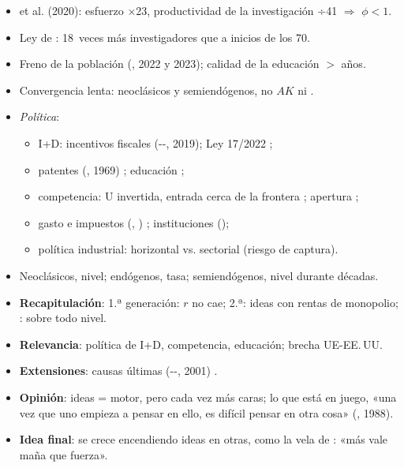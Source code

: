 \documentclass{article}
\begin{document}
\begin{columnas}
\begin{itemize}
\item {} et al. (2020): esfuerzo ×23, productividad de la investigación ÷41 $\Rightarrow$ $\phi<1$.
\item Ley de : 18~veces más investigadores que a inicios de los 70.
\item Freno de la población (, 2022 y 2023); calidad de la educación $>$ años.
\item Convergencia lenta: neoclásicos y semiendógenos, no $AK$ ni  .
\end{itemize}
\begin{itemize}
\item \emph{Política}:
  \begin{itemize}
  \item I+D: incentivos fiscales (--, 2019); Ley 17/2022 ;
  \item patentes (, 1969) ; educación ;
  \item competencia: U invertida, entrada cerca de la frontera ; apertura ;
  \item gasto e impuestos (, ) ; instituciones ();
  \item política industrial: horizontal vs. sectorial (riesgo de captura).
  \end{itemize}
\item Neoclásicos, nivel; endógenos, tasa; semiendógenos, nivel durante décadas.
\end{itemize}

\begin{itemize}
\item \textbf{Recapitulación}: 1.ª generación: $r$ no cae; 2.ª: ideas con rentas de monopolio; : sobre todo nivel.
\item \textbf{Relevancia}: política de I+D, competencia, educación; brecha UE-EE.\,UU.
\item \textbf{Extensiones}: causas últimas (--, 2001)    .
\item \textbf{Opinión}: ideas = motor, pero cada vez más caras; lo que está en juego, «una vez que uno empieza a pensar en ello, es difícil pensar en otra cosa» (, 1988).
\item \textbf{Idea final}: se crece encendiendo ideas en otras, como la vela de : «más vale maña que fuerza».
\end{itemize}


\end{columnas}
\end{document}
